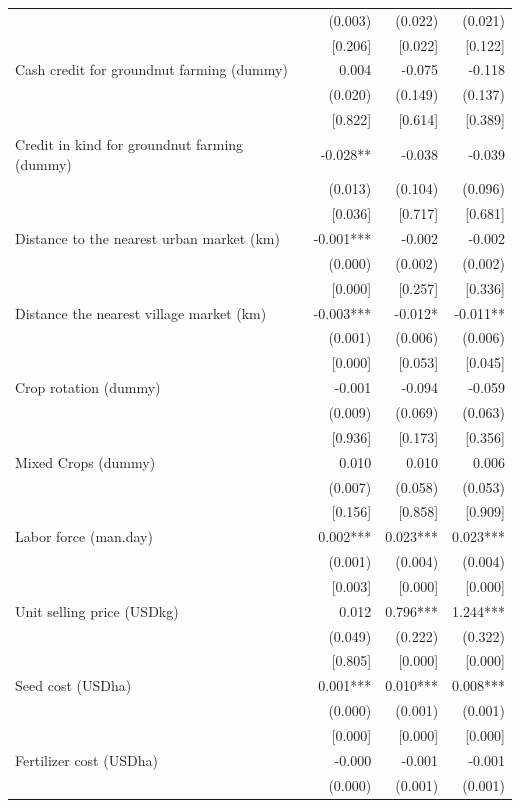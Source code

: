 \documentclass[
]{article}
\begin{document}
\begin{ThreePartTable}
\begin{longtable}[t]{lrrr}
 & (0.003) & (0.022) & (0.021)\\
 & {}[0.206] & {}[0.022] & {}[0.122]\\
Cash credit for groundnut farming (dummy) & 0.004 & -0.075 & -0.118\\
 & (0.020) & (0.149) & (0.137)\\
 & {}[0.822] & {}[0.614] & {}[0.389]\\
Credit in kind for groundnut farming (dummy) & -0.028** & -0.038 & -0.039\\
 & (0.013) & (0.104) & (0.096)\\
 & {}[0.036] & {}[0.717] & {}[0.681]\\
Distance to the nearest urban market (km) & -0.001*** & -0.002 & -0.002\\
 & (0.000) & (0.002) & (0.002)\\
 & {}[0.000] & {}[0.257] & {}[0.336]\\
Distance the nearest village market (km) & -0.003*** & -0.012* & -0.011**\\
 & (0.001) & (0.006) & (0.006)\\
 & {}[0.000] & {}[0.053] & {}[0.045]\\
Crop rotation (dummy) & -0.001 & -0.094 & -0.059\\
 & (0.009) & (0.069) & (0.063)\\
 & {}[0.936] & {}[0.173] & {}[0.356]\\
Mixed Crops (dummy) & 0.010 & 0.010 & 0.006\\
 & (0.007) & (0.058) & (0.053)\\
 & {}[0.156] & {}[0.858] & {}[0.909]\\
Labor force (man.day) & 0.002*** & 0.023*** & 0.023***\\
 & (0.001) & (0.004) & (0.004)\\
 & {}[0.003] & {}[0.000] & {}[0.000]\\
Unit selling price (USD\/kg) & 0.012 & 0.796*** & 1.244***\\
 & (0.049) & (0.222) & (0.322)\\
 & {}[0.805] & {}[0.000] & {}[0.000]\\
Seed cost (USD\/ha) & 0.001*** & 0.010*** & 0.008***\\
 & (0.000) & (0.001) & (0.001)\\
 & {}[0.000] & {}[0.000] & {}[0.000]\\
Fertilizer cost (USD\/ha) & -0.000 & -0.001 & -0.001\\
 & (0.000) & (0.001) & (0.001)\\

\end{longtable}
\end{ThreePartTable}
\end{document}
